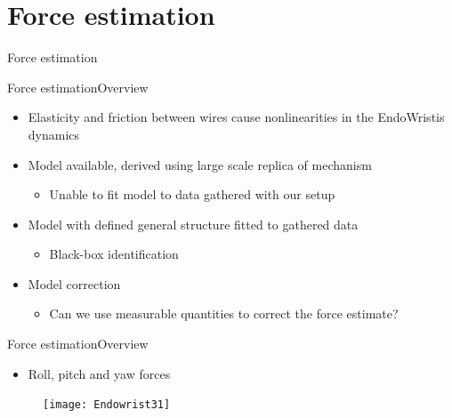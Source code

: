 \section{Force estimation}
\begin{frame}{Force estimation}
\end{frame}

\begin{frame}{Force estimation}{Overview}
\begin{itemize}
\item Elasticity and friction between wires cause nonlinearities in the EndoWristis dynamics
\item Model available, derived using large scale replica of mechanism
	\begin{itemize}
		\item Unable to fit model to data gathered with our setup
	\end{itemize}
	
\item Model with defined general structure fitted to gathered data
	\begin{itemize}
		\item Black-box identification
	\end{itemize}

\item Model correction
	\begin{itemize}
		\item Can we use measurable quantities to correct the force estimate?
	\end{itemize}

\end{itemize}
\end{frame}

\begin{frame}{Force estimation}{Overview}
\begin{itemize}
  	\item Roll, pitch and yaw forces
\end{itemize}
 \begin{figure}[h]
 \centering
 \texttt{[image: Endowrist31]}
 \label{fig:ewr}
 \end{figure}
\end{frame}

